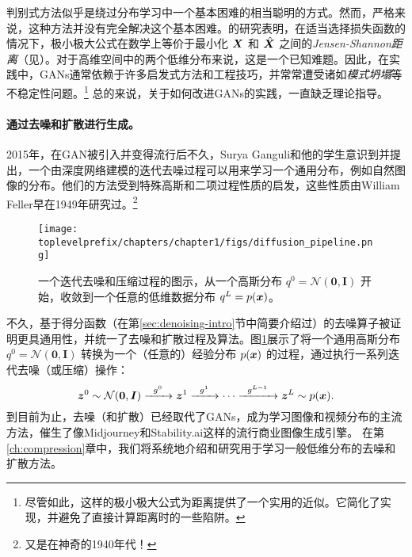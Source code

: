 \documentclass[../../book-main_zh.tex]{subfiles}
\begin{document}
判别式方法似乎是绕过分布学习中一个基本困难的相当聪明的方式。然而，严格来说，这种方法并没有完全解决这个基本困难。\cite{Goodfellow-2014}的研究表明，在适当选择损失函数的情况下，极小极大公式在数学上等价于最小化 $\bm{X}$ 和 $\hat {\bm{X}}$ 之间的{\em Jensen-Shannon距离}（见\cite{Cover-Thomas}）。对于高维空间中的两个低维分布来说，这是一个已知难题。因此，在实践中，GANs通常依赖于许多启发式方法和工程技巧，并常常遭受诸如{\em 模式坍塌}等不稳定性问题。\footnote{尽管如此，这样的极小极大公式为距离提供了一个实用的近似。它简化了实现，并避免了直接计算距离时的一些陷阱。} 总的来说，关于如何改进GANs的实践，一直缺乏理论指导。

\paragraph{通过去噪和扩散进行生成。}
2015年，在GAN被引入并变得流行后不久，Surya Ganguli和他的学生意识到并提出，一个由深度网络建模的迭代去噪过程可以用来学习一个通用分布，例如自然图像的分布\cite{Sohl-Dickstein2015}。他们的方法受到特殊高斯和二项过程性质的启发，这些性质由William Feller早在1949年研究过\cite{Feller1949OnTT}。\footnote{又是在神奇的1940年代！}
\begin{figure}[t]
    \centering
    \texttt{[image: \\toplevelprefix/chapters/chapter1/figs/diffusion\_pipeline.png]}
    \caption{一个迭代去噪和压缩过程的图示，从一个高斯分布 $q^0 = \mathcal{N}(\boldsymbol{0}, \boldsymbol{I})$ 开始，收敛到一个任意的低维数据分布 $q^L = p(\bm{x})$。}
    \label{fig:diffusion}
\end{figure}

不久，基于得分函数\cite{hyvarinen05a}（在第\ref{sec:denoising-intro}节中简要介绍过）的去噪算子被证明更具通用性，并统一了去噪和扩散过程及算法\cite{song2019,song2020score,ho2020denoising}。图\ref{fig:diffusion}展示了将一个通用高斯分布 $q^0 = \mathcal{N}(\boldsymbol{0}, \boldsymbol{I})$ 转换为一个（任意的）经验分布 $p(\bm{x})$ 的过程，通过执行一系列迭代去噪（或压缩）操作：
\begin{equation}
        \bm{z}^0 \sim  \mathcal{N}(\boldsymbol{0}, \boldsymbol{I})\xrightarrow{\hspace{2mm} g^0  \hspace{2mm}} \bm{z}^1 \xrightarrow{\hspace{2mm} g^1 \hspace{2mm}} \cdots \xrightarrow{\hspace{2mm} g^{L-1}  \hspace{2mm}} \bm{z}^L \sim p(\bm{x}).
\end{equation}
到目前为止，去噪（和扩散）已经取代了GANs，成为学习图像和视频分布的主流方法，催生了像Midjourney和Stability.ai这样的流行商业图像生成引擎。
在第\ref{ch:compression}章中，我们将系统地介绍和研究用于学习一般低维分布的去噪和扩散方法。
\end{document}
